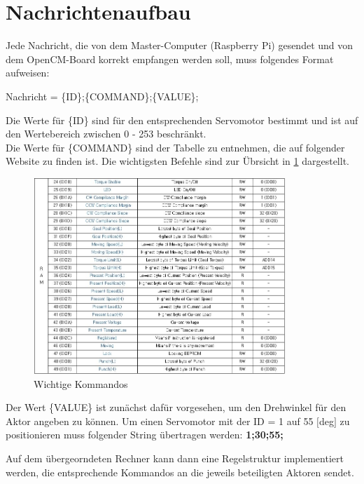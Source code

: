 \section{Nachrichtenaufbau}
\label{sec:Nachrichtenaufbau}
Jede Nachricht, die von dem Master-Computer (Raspberry Pi) gesendet und von dem 
OpenCM-Board korrekt empfangen werden soll, muss folgendes Format aufweisen:

Nachricht = \{ID\};\{COMMAND\};\{VALUE\};

Die Werte für \{ID\} sind für den entsprechenden Servomotor bestimmt und ist 
auf den Wertebereich zwischen 0 - 253 beschränkt.\\
Die Werte für \{COMMAND\} sind der Tabelle zu entnehmen, die auf folgender 
Website \url{} zu finden ist. Die wichtigsten Befehle sind zur Übrsicht in 
\ref{fig:commands} dargestellt.

\begin{figure}[H]
	\centering
	\includegraphics[width=0.85\textwidth]{03_Grafiken/Grundlagen/Nachrichtenaufbau/CommandsTable.jpg}
	\caption[Wichtige Kommandos]{Wichtige Kommandos}
	\label{fig:commands}
\end{figure}

Der Wert \{VALUE\} ist zunächst dafür vorgesehen, um den Drehwinkel für den 
Aktor angeben zu können. Um einen Servomotor mit der ID = 1 auf 55 $[$deg$]$ zu 
positionieren muss folgender String übertragen werden: \textbf{1;30;55;}

Auf dem übergeorndeten Rechner kann dann eine Regelstruktur implementiert 
werden, die entsprechende Kommandos an die jeweils beteiligten Aktoren sendet.
